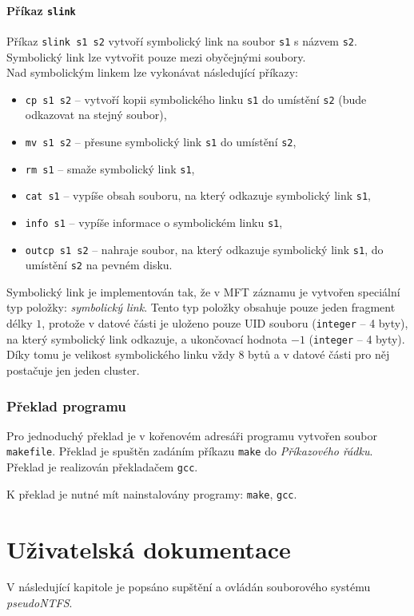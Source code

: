 \documentclass[
11pt,
a4paper,
pdftex,
czech,
titlepage
]{report}
\begin{document}
\subsubsection{Příkaz \texttt{slink}}
Příkaz \texttt{slink s1 s2} vytvoří symbolický link na soubor \texttt{s1} s názvem \texttt{s2}. Symbolický link lze vytvořit pouze mezi obyčejnými soubory.\\[0.5\baselineskip]
\noindent Nad symbolickým linkem lze vykonávat následující příkazy:
\begin{itemize}
\item \texttt{cp s1 s2} -- vytvoří kopii symbolického linku \texttt{s1} do umístění \texttt{s2} (bude odkazovat na stejný soubor),
\item \texttt{mv s1 s2} -- přesune symbolický link \texttt{s1} do umístění \texttt{s2},
\item \texttt{rm s1} -- smaže symbolický link \texttt{s1},
\item \texttt{cat s1} -- vypíše obsah souboru, na který odkazuje symbolický link \texttt{s1},
\item \texttt{info s1} -- vypíše informace o symbolickém linku \texttt{s1},
\item \texttt{outcp s1 s2} -- nahraje soubor, na který odkazuje symbolický link \texttt{s1}, do umístění \texttt{s2} na pevném disku.\\
\end{itemize}

\noindent Symbolický link je implementován tak, že v MFT záznamu je vytvořen speciální typ položky: \textit{symbolický link}. Tento typ položky obsahuje pouze jeden fragment délky $1$, protože v datové části je uloženo pouze UID souboru (\texttt{integer} -- 4 byty), na který symbolický link odkazuje, a ukončovací hodnota $-1$  (\texttt{integer} -- 4 byty). Díky tomu je velikost symbolického linku vždy 8 bytů a v datové části pro něj postačuje jen jeden cluster.

\subsection{Překlad programu}
Pro jednoduchý překlad je v kořenovém adresáři programu vytvořen soubor \texttt{makefile}. Překlad je spuštěn zadáním příkazu \texttt{make} do \textit{Příkazového řádku}. Překlad je realizován překladačem \texttt{gcc}. 

K překlad je nutné mít nainstalovány programy: \texttt{make}, \texttt{gcc}.

\chapter{Uživatelská dokumentace}
V následující kapitole je popsáno supštění a ovládán souborového systému \textit{pseudoNTFS}.
\end{document}

